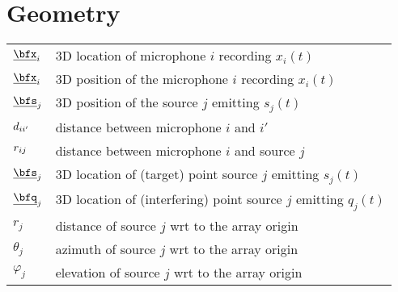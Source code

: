
\section*{Geometry}
\begin{table}[H]
    \begin{tabular}{ll}
        $\underline{\bfx}_i$     & 3D location of microphone $i$ recording $x_i(t)$\\
        $\positionMicrophone_i$ & 3D position of the microphone $i$ recording $x_i(t)$\\
        $\positionSource_j$ & 3D position of the source $j$ emitting $s_j(t)$\\
        $d_{ii'}$           & distance between microphone $i$ and $i'$ \\
        $r_{ij}$     & distance between microphone $i$ and source $j$ \\
        $\underline{\bfs}_j$     & 3D location of (target) point source $j$ emitting $s_j(t)$\\
        $\underline{\bfq}_j$     & 3D location of (interfering) point source $j$ emitting $q_j(t)$\\
        $r_{j}$    & distance of source $j$ wrt to the array origin \\
        $\theta_{j}$    & azimuth of source $j$ wrt to the array origin\\
        $\varphi_{j}$    & elevation of source $j$ wrt to the array origin \\
    \end{tabular}
\end{table}

